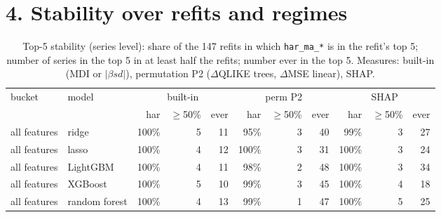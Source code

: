 \documentclass[10pt]{article}
\begin{document}
\section*{4. Stability over refits and regimes}
\begin{table}[H]\centering\scriptsize
\caption{Top-5 stability (series level): share of the 147 refits in which \texttt{har\_ma\_*} is in the refit's top 5; number of series in the top 5 in at least half the refits; number ever in the top 5. Measures: built-in (MDI or $|\beta sd|$), permutation P2 ($\Delta$QLIKE trees, $\Delta$MSE linear), SHAP.}
\begin{tabular}{llrrrrrrrrr}\toprule
bucket & model & \multicolumn{3}{c}{built-in} & \multicolumn{3}{c}{perm P2} & \multicolumn{3}{c}{SHAP}\\ & & har & $\ge$50\% & ever & har & $\ge$50\% & ever & har & $\ge$50\% & ever\\\midrule
all features & ridge & 100\% & 5 & 11 & 95\% & 3 & 40 & 99\% & 3 & 27 \\
all features & lasso & 100\% & 4 & 12 & 100\% & 3 & 31 & 100\% & 3 & 24 \\
all features & LightGBM & 100\% & 4 & 11 & 98\% & 2 & 48 & 100\% & 3 & 34 \\
all features & XGBoost & 100\% & 5 & 10 & 99\% & 3 & 45 & 100\% & 4 & 18 \\
all features & random forest & 100\% & 4 & 13 & 99\% & 1 & 47 & 100\% & 5 & 25 \\
\bottomrule\end{tabular}\end{table}
\end{document}
